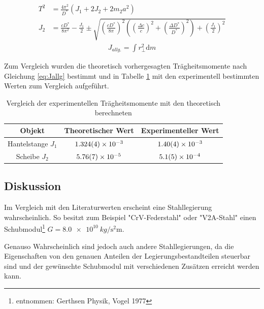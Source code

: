 \begin{align}
		T^2&= \frac{4 \pi^2}{D^*}(J_1+2J_2+2m_2 a^2)
	\label{eq:hantelta}\\
J_2&=\frac{c D^*}{8 \pi ^2}-\frac{J_1}{2} \pm \sqrt{\left( \frac{c D^*}{8 \pi}\right) ^2\left( \left( \frac{\Delta c}{c}\right) ^2+  \left( \frac{\Delta D^*}{D^*}\right) ^2\right) + \left(\frac{J_1}{2}\right)^2 }\label{eq:hantelJ2}
\end{align}
\begin{align}
	J_{allg.}=\int r_{\perp}^2 \textrm{d}m
	\label{eq:Jallg}
\end{align}

Zum Vergleich wurden die theoretisch vorhergesagten Trägheitsmomente nach Gleichung \ref{eq:Jallg} bestimmt und in Tabelle \ref{tab:vglJ} mit den experimentell bestimmten Werten zum Vergleich aufgeführt. 

\begin{table}[h!]
	\caption{Vergleich der experimentellen Trägheitsmomente mit den theoretisch berechneten}
	\begin{tabular}{|c|c|c|}
		\hline 
		Objekt &Theoretischer Wert	& Experimenteller Wert  \\ 
		\hline 
		Hantelstange $J_1$ &$\SI{1.324\pm 0.004 e-3}{}$	& $\SI{1.40\pm 0.04e-3}{}$ \\ 
		\hline 
		Scheibe $J_2$&  $\SI{5.76\pm 0.07e-5}{}$	&$\SI{5.1 \pm 0.5  e-04}{}$ \\ 
		\hline 
	\end{tabular} 
	\label{tab:vglJ}
\end{table}








\subsection{Diskussion}
\label{sec:disc:pendel}

Im Vergleich mit den Literaturwerten erscheint eine Stahllegierung wahrscheinlich. So besitzt zum Beispiel "CrV-Federstahl" oder "V2A-Stahl" einen Schubmodul\footnote{entnommen: Gerthsen Physik, Vogel 1977} $G=\SI{8.0 e10}{kg \per  \second \squared \metre}$.

Genauso Wahrscheinlich sind jedoch auch andere Stahllegierungen, da die Eigenschaften von den genauen Anteilen der Legierungsbestandteilen steuerbar sind und der gewünschte Schubmodul mit verschiedenen Zusätzen erreicht werden kann.\\

